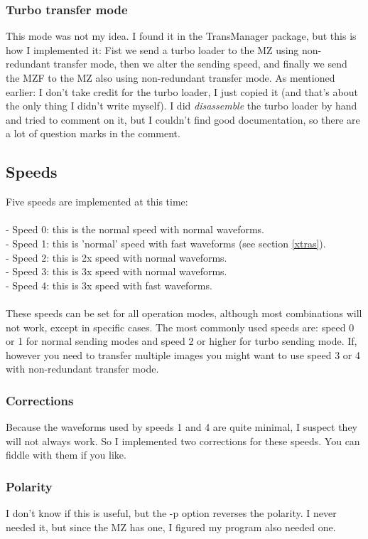 \subsubsection{Turbo transfer mode}
This mode was not my idea. I found it in the TransManager package, but this is
how I implemented it: Fist we send a turbo loader to the MZ using non-redundant
transfer mode, then we alter the sending speed, and finally we send the MZF
to the MZ also using non-redundant transfer mode. As mentioned earlier: I don't
take credit for the turbo loader, I just copied it (and that's about the only
thing I didn't write myself). I did \emph{disassemble} \cite{MZD} the turbo 
loader by hand and 
tried to comment on it, but I couldn't find good documentation, so there are
a lot of question marks in the comment.

\subsection{Speeds}
Five speeds are implemented at this time: \\ \\
- Speed 0: this is the normal speed with normal waveforms. \\
- Speed 1: this is 'normal' speed with fast waveforms (see section 
\ref{xtras}). \\
- Speed 2: this is 2x speed with normal waveforms. \\
- Speed 3: this is 3x speed with normal waveforms. \\
- Speed 4: this is 3x speed with fast waveforms. \\ \\
These speeds can be set for all operation modes, although most combinations
will not work, except in specific cases. The most commonly used speeds are:
speed 0 or 1 for normal sending modes and speed 2 or higher for turbo sending
mode. If, however you need to transfer multiple images you might want to use
speed 3 or 4 with non-redundant transfer mode.

\subsubsection{Corrections}
Because the waveforms used by speeds 1 and 4 are quite minimal, I suspect
they will not always work. So I implemented two corrections for these speeds.
You can fiddle with them if you like.

\subsubsection{Polarity}
I don't know if this is useful, but the -p option reverses the polarity. I 
never needed it, but since the MZ has one, I figured my program also needed
one.

